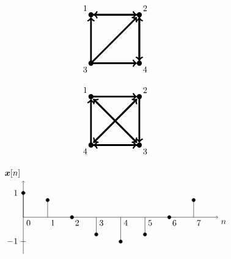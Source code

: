 \documentclass[12pt]{article}
\begin{document}
$$
\begin{tikzpicture}[scale=2.0,line width=2pt]
\filldraw (0,0) circle (1pt); \filldraw (0,1) circle (1pt);
\filldraw (1,1) circle (1pt); \filldraw (1,0) circle (1pt);
\draw (0,1) node[anchor=south east] {1};
\draw (1,1) node[anchor=south west] {2};
\draw (1,0) node[anchor=north west] {4};
\draw (0,0) node[anchor=north east] {3};
\draw [->] (0,0) to (0,0.95);
\draw [->] (0,0) to (0.95,0);
\draw [->] (0,0) to (0.95,0.95);
\draw [->] (1,0.95) to (1,0.05);
\draw [->] (1,0.05) to (1,0.95);
\draw [->] (0.05,1) to (0.95,1);
\draw [->] (0.95,1) to (0.05,1);
\end{tikzpicture}
$$

$$
\begin{tikzpicture}[scale=2.0,line width=2pt]
\filldraw (0,0) circle (1pt); \filldraw (0,1) circle (1pt);
\filldraw (1,1) circle (1pt); \filldraw (1,0) circle (1pt);
\draw (0,1) node[anchor=south east] {1};
\draw (1,1) node[anchor=south west] {2};
\draw (1,0) node[anchor=north west] {3};
\draw (0,0) node[anchor=north east] {4};
\draw [->] (0,0) to (0,0.95);
\draw [->] (0.05,0) to (0.95,0);
\draw [->] (0.95,0) to (0.05,0);
\draw [->] (0.05,0.05) to (0.95,0.95);
\draw [->] (0.95,0.95) to (0.05,0.05);
\draw [->] (0.05,0.95) to (0.95,0.05);
\draw [->] (0.95,0.05) to (0.05,0.95);
\draw [->] (1,0.95) to (1,0.05);
\draw [->] (0.05,1) to (0.95,1);

\end{tikzpicture}
$$

$$
\begin{tikzpicture}
\draw [->] (0,0) -- (8,0) node[below right] {$n$}; \draw [->] (0,-1.5) -- (0,1.5) node[above left] {$\boldsymbol{x}[n]$};
\draw (0.1,1) -- (-0.1,1) node[left] {1}; \draw (0.1,-1) -- (-0.1,-1) node[left] {$-1$};
\foreach \x/\y in { 0/1 , 1/0.7071 , 2/0 , 3/-0.7071 , 4/-1 , 5/-0.7071 , 6/0 , 7/0.7071} { \filldraw (\x,0) -- (\x,\y) circle[radius=2pt]; }
\foreach \k in {0,...,7} { \draw (\k,0) node[below right] {$\k$}; }
\end{tikzpicture}
$$
\end{document}
